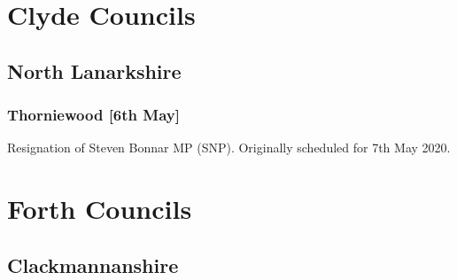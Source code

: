 \documentclass[a4paper,openany]{book}
\begin{document}
\begin{resultsiii}
%
%

\section{Clyde Councils}

\subsection*{North Lanarkshire}

\subsubsection*{Thorniewood \hspace*{\fill}\nolinebreak[1]%
	\enspace\hspace*{\fill}
	[6th May]}


Resignation of Steven Bonnar MP (SNP).  Originally scheduled for 7th May 2020.

\section{Forth Councils}

\subsection*{Clackmannanshire}


\end{resultsiii}
\end{document}
